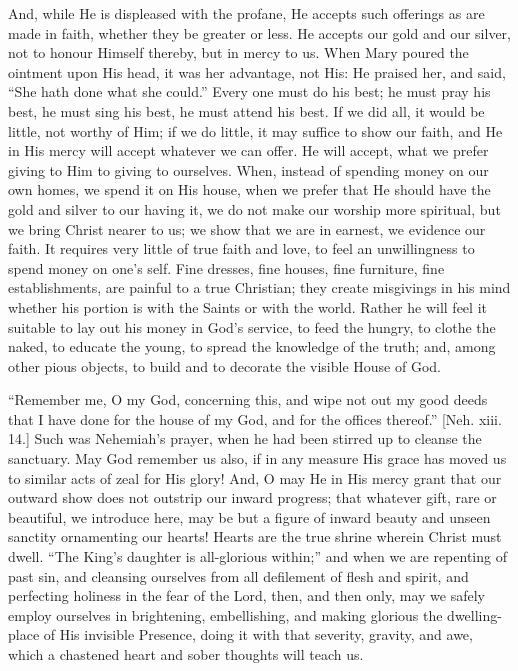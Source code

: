 And, while He is displeased with the profane, He accepts such
offerings as are made in faith, whether they be greater or less. He
accepts our gold and our silver, not to honour Himself thereby, but in
mercy to us. When Mary poured the ointment upon His head, it was her
advantage, not His: He praised her, and said, ``She hath done what
she could.'' Every one must do his best; he must pray his best, he
must sing his best, he must attend his best. If we did all, it would
be little, not worthy of Him; if we do little, it may suffice to show
our faith, and He in His mercy will accept whatever we can offer. He
will accept, what we prefer giving to Him to giving to ourselves.
When, instead of spending money on our own homes, we spend it on His
house, when we prefer that He should have the gold and silver to our
having it, we do not make our worship more spiritual, but we bring
Christ nearer to us; we show that we are in earnest, we evidence our
faith. It requires very little of true faith and love, to feel an
unwillingness to spend money on one's self. Fine dresses, fine houses,
fine furniture, fine establishments, are painful to a true Christian;
they create misgivings in his mind whether his portion is with the
Saints or with the world. Rather he will feel it suitable to lay out
his money in God's service, to feed the hungry, to clothe the naked,
to educate the young, to spread the knowledge of the truth; and, among
other pious objects, to build and to decorate the visible House of
God.

``Remember me, O my God, concerning this, and wipe not out my
good deeds that I have done for the house of my God, and for the
offices thereof.'' [Neh. xiii. 14.] Such was Nehemiah's prayer,
when he had been stirred up to cleanse the sanctuary. May God remember
us also, if in any measure His grace has moved us to similar acts of
zeal for His glory! And, O may He in His mercy grant that our outward
show does not outstrip our inward progress; that whatever gift, rare
or beautiful, we introduce here, may be but a figure of inward beauty
and unseen sanctity ornamenting our hearts! Hearts are the true shrine
wherein Christ must dwell. ``The King's daughter is all-glorious
within;'' and when we are repenting of past sin, and cleansing
ourselves from all defilement of flesh and spirit, and perfecting
holiness in the fear of the Lord, then, and then only, may we safely
employ ourselves in brightening, embellishing, and making glorious the
dwelling-place of His invisible Presence, doing it with that severity,
gravity, and awe, which a chastened heart and sober thoughts will
teach us.

